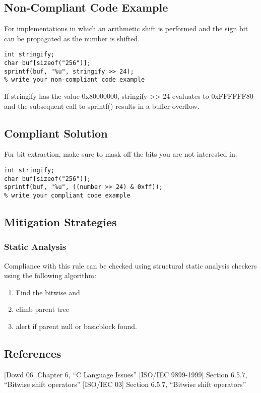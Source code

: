 \subsection{Non-Compliant Code Example}

For implementations in which an arithmetic shift is performed and the
sign bit can be propagated as the number is shifted.
\begin{verbatim}
int stringify;
char buf[sizeof("256")];
sprintf(buf, "%u", stringify >> 24);
% write your non-compliant code example

\end{verbatim}
If stringify has the value 0x80000000, stringify >> 24 evaluates to
0xFFFFFF80 and the subsequent call to sprintf() results in a buffer overflow.
\subsection{Compliant Solution}
For bit extraction, make sure to mask off the bits you are not
interested in.

\begin{verbatim}
int stringify;
char buf[sizeof("256")];
sprintf(buf, "%u", ((number >> 24) & 0xff));
% write your compliant code example

\end{verbatim}

\subsection{Mitigation Strategies}
\subsubsection{Static Analysis} 

Compliance with this rule can be checked using structural static analysis checkers using the following algorithm:

\begin{enumerate}
\item Find the bitwise and
\item climb parent tree
\item alert if parent null or basicblock found.
\end{enumerate}

\subsection{References}

[Dowd 06] Chapter 6, ``C Language Issues''
[ISO/IEC 9899-1999] Section 6.5.7, ``Bitwise shift operators''
[ISO/IEC 03] Section 6.5.7, ``Bitwise shift operators''